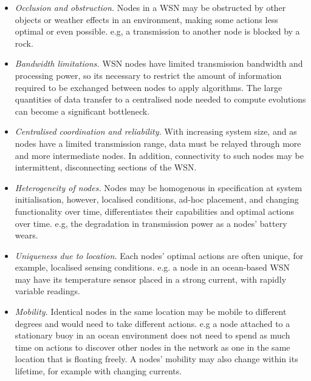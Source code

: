 \begin{itemize}
	\item \textit{Occlusion and obstruction.} Nodes in a WSN may be obstructed by other objects or weather effects in an environment, making some actions less optimal or even possible. e.g, a transmission to another node is blocked by a rock.

	\item \textit{Bandwidth limitations.} WSN nodes  have limited transmission bandwidth and processing power, so its necessary to restrict the amount of information required to be exchanged between nodes to apply algorithms. The large quantities of data transfer to a centralised node needed to compute evolutions can become a significant bottleneck.
	
	\item \textit{Centralised coordination and reliability.} With increasing system size, and as nodes have a limited transmission range, data must be relayed through more and more intermediate nodes. In addition, connectivity to such nodes may be intermittent, disconnecting sections of the WSN. 
	
	\item \textit{Heterogeneity of nodes.} Nodes may be homogenous in specification at system initialisation, however, localised conditions, ad-hoc placement, and changing functionality over time, differentiates their capabilities and optimal actions over time. e.g, the degradation in transmission power as a nodes' battery wears.
	
	\item \textit{Uniqueness due to location.} Each nodes' optimal actions are often unique, for example, localised sensing conditions. e.g. a node in an ocean-based WSN may have its temperature sensor placed in a strong current, with rapidly variable readings.
	
	\item \textit{Mobility.} Identical nodes in the same location may be mobile to different degrees and would need to take different actions. e.g a node attached to a stationary buoy in an ocean environment does not need to spend as much time on actions to discover other nodes in the network as one in the same location that is floating freely. A nodes' mobility may also change within its lifetime, for example with changing currents.
\end{itemize}


